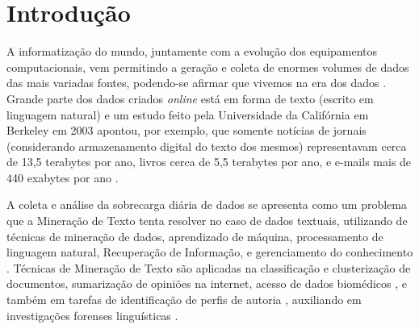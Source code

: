 \chapter{Introdução} \label{ch:Introdução}
    A informatização do mundo, juntamente com a evolução dos equipamentos computacionais, vem permitindo a geração e coleta de enormes volumes de dados das mais variadas fontes, podendo-se afirmar que vivemos na era dos dados \cite[p.~1]{Han:2011:DMC:1972541}.
    Grande parte dos dados criados \textit{online} está em forma de texto (escrito em linguagem natural) e um estudo feito pela Universidade da Califórnia em Berkeley em 2003 apontou, por exemplo, que somente notícias de jornais (considerando armazenamento digital do texto dos mesmos) representavam cerca de 13,5 terabytes por ano, livros cerca de 5,5 terabytes por ano, e e-mails mais de 440 exabytes por ano \cite{lyman2003much} \cite[p.~3]{Zhai2016TDMA}.
    
    A coleta e análise da sobrecarga diária de dados se apresenta como um problema que a Mineração de Texto tenta resolver no caso de dados textuais, utilizando de técnicas de mineração de dados, aprendizado de máquina, processamento de linguagem natural, Recuperação de Informação, e gerenciamento do conhecimento \cite[p.~1]{Han:2011:DMC:1972541} \cite{Feldman:2006:TMH:1076381}.
    Técnicas de Mineração de Texto são aplicadas na classificação e clusterização de documentos, sumarização de opiniões na internet, acesso de dados biomédicos \cite[p.~4--8]{Aggarwal_MTD_2012},
    e também em tarefas de identificação de perfis de autoria\footnotemark{} \cite[p.~906]{rangel2014overview} \cite[p.~6--7]{rangel2018overview}, auxiliando em investigações forenses linguísticas \cite{Chaski_Author_2012}. 
    
    
